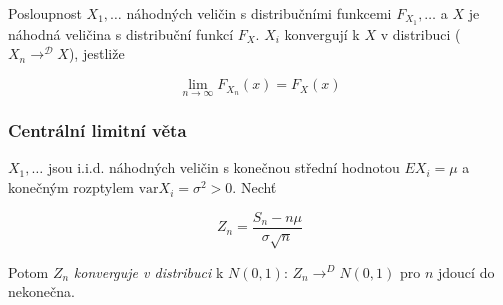 Posloupnost $X_1, \dots$ náhodných veličin s distribučními funkcemi $F_{X_1}, \dots$ a $X$ je náhodná veličina s distribuční funkcí $F_X$.
$X_i$ konvergují k $X$ v distribuci ($X_n \rightarrow^{\mathcal{D}} X$), jestliže

$$
    \lim_{n\rightarrow\infty}{F_{X_n}(x)} = F_X(x)
$$


\subsubsection*{Centrální limitní věta}

$X_1, \dots$ jsou i.i.d. náhodných veličin s konečnou střední hodnotou $EX_i=\mu$ a konečným rozptylem $\textrm{var}X_i = \sigma^2 > 0$.
Nechť

$$
    Z_n = \frac{S_n - n\mu}{\sigma\sqrt{n}}
$$

Potom $Z_n$ \textit{konverguje v distribuci} k $N(0,1)$: $Z_n \rightarrow^{D} N(0,1)$ pro $n$ jdoucí do nekonečna.